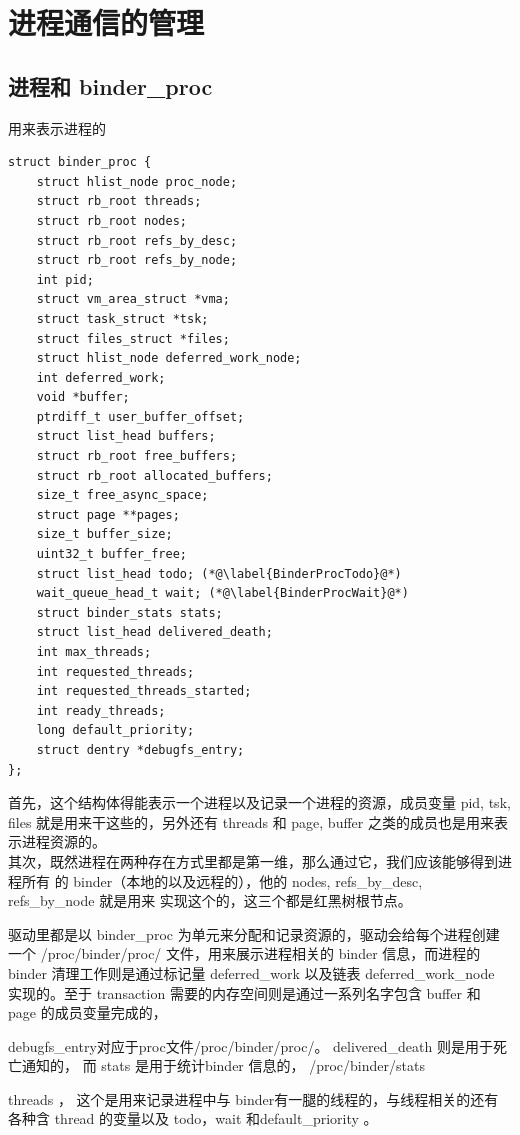 \documentclass[a4paper,11pt]{article}
\begin{document}
\section{进程通信的管理}

\subsection{ 进程和 binder_proc }
用来表示进程的
\begin{lstlisting}[language=KC, xleftmargin=3pt, multicols=2]
struct binder_proc {
    struct hlist_node proc_node;
    struct rb_root threads;
    struct rb_root nodes;
    struct rb_root refs_by_desc;
    struct rb_root refs_by_node;
    int pid;
    struct vm_area_struct *vma;
    struct task_struct *tsk;
    struct files_struct *files;
    struct hlist_node deferred_work_node;
    int deferred_work;
    void *buffer;
    ptrdiff_t user_buffer_offset;
    struct list_head buffers;
    struct rb_root free_buffers;
    struct rb_root allocated_buffers;
    size_t free_async_space;
    struct page **pages;
    size_t buffer_size;
    uint32_t buffer_free;
    struct list_head todo; (*@\label{BinderProcTodo}@*)
    wait_queue_head_t wait; (*@\label{BinderProcWait}@*)
    struct binder_stats stats;
    struct list_head delivered_death;
    int max_threads;
    int requested_threads;
    int requested_threads_started;
    int ready_threads;
    long default_priority;
    struct dentry *debugfs_entry;
};
\end{lstlisting}
首先，这个结构体得能表示一个进程以及记录一个进程的资源，成员变量 pid, tsk,
files 就是用来干这些的，另外还有 threads 和 page, buffer 之类的成员也是用来表
示进程资源的。\\
其次，既然进程在两种存在方式里都是第一维，那么通过它，我们应该能够得到进程所有
的 binder（本地的以及远程的），他的 nodes, refs_by_desc, refs_by_node 就是用来
实现这个的，这三个都是红黑树根节点。

驱动里都是以 binder_proc
为单元来分配和记录资源的，驱动会给每个进程创建一个 /proc/binder/proc/
文件，用来展示进程相关的 binder 信息，而进程的 binder 清理工作则是通过标记量
deferred_work 以及链表 deferred_work_node 实现的。至于 transaction
需要的内存空间则是通过一系列名字包含 buffer 和 page
的成员变量完成的，

debugfs_entry对应于proc文件/proc/binder/proc/。
 delivered_death 则是用于死亡通知的，
 而 stats 是用于统计binder 信息的， /proc/binder/stats

threads ， 这个是用来记录进程中与 binder有一腿的线程的，与线程相关的还有各种含 thread 的变量以及 todo，wait 和default_priority 。
\end{document}
